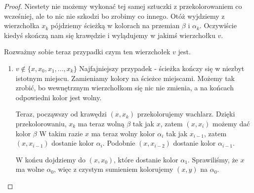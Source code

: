 \begin{proof}
	Niestety nie możemy wykonać tej samej sztuczki z przekolorowaniem co wcześniej, ale to nic nie szkodzi bo zrobimy co innego.
	Otóż wyjdziemy z wierzchołka $x_k$ pójdziemy ścieżką w kolorach na przemian $\beta$ i $\alpha_k$.
	Oczywiście kiedyś skończą nam się krawędzie i wylądujemy w jakimś wierzchołku $v$.

	Rozważmy sobie teraz przypadki czym ten wierzchołek $v$ jest.

	\begin{enumerate}
		\item $v \notin \{x, x_0, x_1, ..., x_k\}$
		      Najfajniejszy przypadek - ścieżka kończy się w niezbyt istotnym miejscu. Zamieniamy kolory na ścieżce miejscami. Możemy tak zrobić, bo wewnętrznym wierzchołkom się nic nie zmienia, a na końcach odpowiedni kolor jest wolny.

		      Teraz, począwszy od krawędzi $(x, x_k)$ przekolorujemy wachlarz.
		      Dzięki przekolorowaniu, $x_k$ ma teraz wolną $\beta$ tak jak $x$, zatem $(x, x_i)$ możemy dać kolor $\beta$
		      W takim razie $x$ ma teraz wolny kolor $\alpha_i$ tak jak $x_{i - 1}$,
		      zatem $(x, x_{i-1})$ dostanie kolor $\alpha_i$.
		      Podobnie $(x, x_{i-2})$ dostanie kolor $\alpha_{i-1}$.

		      W końcu dojdziemy do $(x, x_0)$, które dostanie kolor $\alpha_1$. Sprawiliśmy, że $x$ ma wolne $\alpha_0$,
		      więc z czystym sumieniem kolorujemy $(x, y)$ na $\alpha_0$.


\end{enumerate}
\end{proof}
